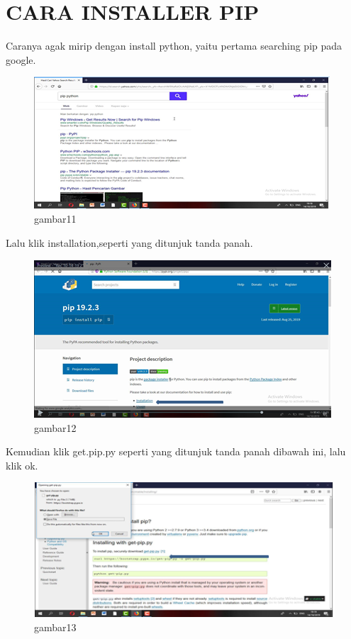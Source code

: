 \section{CARA INSTALLER PIP}
Caranya agak mirip dengan install python, yaitu pertama searching pip pada google.
\begin{figure}[h]
\centering
    \includegraphics[scale=0.9]{section/41.png}
\caption{gambar11}
\label{fig:my_label}
\end{figure}

Lalu klik installation,seperti yang ditunjuk tanda panah.
\begin{figure}[h]
\centering
    \includegraphics[scale=0.9]{section/42.png}
\caption{gambar12}
\label{fig:my_label}
\end{figure}

Kemudian klik get.pip.py seperti yang ditunjuk tanda panah dibawah ini, lalu klik ok.
\begin{figure}[h]
\centering
    \includegraphics[scale=0.9]{section/43.png}
\caption{gambar13}
\label{fig:my_label}
\end{figure}

